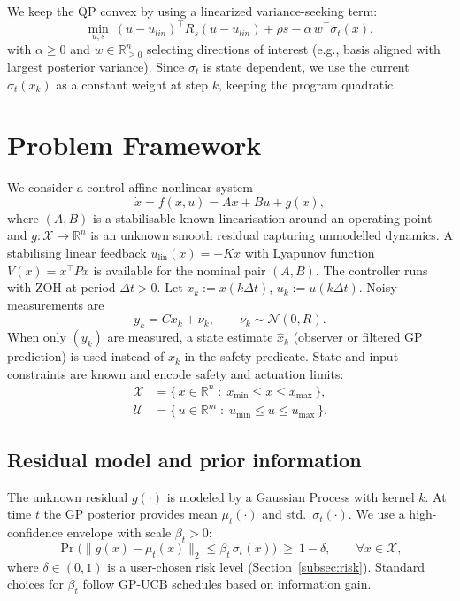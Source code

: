 \documentclass[10pt]{article}
\newcommand{\R}{\mathbb{R}}
\newcommand{\sig}{\sigma}
\newcommand{\1}{\mathbbm{1}}
\begin{document}
We keep the QP convex by using a linearized variance-seeking term:
\[
\min_{u,s}\ (u-u_{lin})^\top R_s (u-u_{lin}) + \rho s - \alpha\, {w}^\top \sig_t(x),
\]
with $\alpha\ge 0$ and ${w}\in\R^n_{\ge 0}$ selecting directions of interest (e.g., basis aligned with largest posterior variance). Since $\sig_t$ is state dependent, we use the current $\sig_t(x_k)$ as a constant weight at step $k$, keeping the program quadratic. 

\section{Problem Framework}\label{sec:problem}

We consider a control-affine nonlinear system
\begin{equation}\label{eq:plant}
\dot x = f(x,u) = Ax + Bu + g(x),
\end{equation}
where \((A,B)\) is a stabilisable known linearisation around an operating point and \(g:\mathcal X\to\mathbb R^{n}\) is an unknown smooth residual capturing unmodelled dynamics. A stabilising linear feedback \(u_{\mathrm{lin}}(x)=-Kx\) with Lyapunov function \(V(x)=x^\top P x\) is available for the nominal pair \((A,B)\).
The controller runs with ZOH at period \(\Delta t>0\). Let \(x_k:=x(k\Delta t)\), \(u_k:=u(k\Delta t)\). Noisy measurements are
\begin{equation}
y_k = Cx_k + \nu_k,\qquad \nu_k\sim\mathcal N(0,R).
\end{equation}
When only \((y_k)\) are measured, a state estimate \(\hat x_k\) (observer or filtered GP prediction) is used instead of \(x_k\) in the safety predicate.
State and input constraints are known and encode safety and actuation limits:
\begin{align}\label{eq:box-constraints}
\mathcal X &= \{\,x \in \mathbb{R}^n \;:\; x_{\min}\le x \le x_{\max}\,\},\\[-2pt]
\mathcal U &= \{\,u \in \mathbb{R}^m \;:\; u_{\min}\le u \le u_{\max}\,\}. 
\end{align}

\subsection{Residual model and prior information}
The unknown residual \(g(\cdot)\) is modeled by a Gaussian Process with kernel \(k\). At time \(t\) the GP posterior provides mean \(\mu_t(\cdot)\) and std.\ \(\sigma_t(\cdot)\). We use a high-confidence envelope with scale \(\beta_t>0\):
\begin{equation}\label{eq:hp-envelope}
\Pr\big(\|g(x)-\mu_t(x)\|_2 \le \beta_t\,\sigma_t(x)\big)\ \ge\ 1-\delta,
\qquad \forall x\in\mathcal X,
\end{equation}
where \(\delta\in(0,1)\) is a user-chosen risk level (Section~\ref{subsec:risk}). Standard choices for \(\beta_t\) follow GP-UCB schedules based on information gain.
\end{document}
